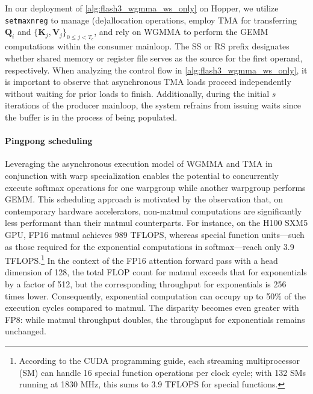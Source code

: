 In our deployment of \cref{alg:flash3_wgmma_ws_only} on Hopper, we utilize \verb|setmaxnreg| to manage (de)allocation operations, employ TMA for transferring $\mathbf{Q}_i$ and $\{ \mathbf{K}_j, \mathbf{V}_j \}_{0 \leq j < T_c}$, and rely on WGMMA to perform the GEMM computations within the consumer mainloop. The SS or RS prefix designates whether shared memory or register file serves as the source for the first operand, respectively. When analyzing the control flow in \cref{alg:flash3_wgmma_ws_only}, it is important to observe that asynchronous TMA loads proceed independently without waiting for prior loads to finish. Additionally, during the initial $s$ iterations of the producer mainloop, the system refrains from issuing waits since the buffer is in the process of being populated.

\paragraph{Pingpong scheduling} Leveraging the asynchronous execution model of WGMMA and TMA in conjunction with warp specialization enables the potential to concurrently execute softmax operations for one warpgroup while another warpgroup performs GEMM. This scheduling approach is motivated by the observation that, on contemporary hardware accelerators, non-matmul computations are significantly less performant than their matmul counterparts. For instance, on the H100 SXM5 GPU, FP16 matmul achieves 989 TFLOPS, whereas special function units—such as those required for the exponential computations in softmax—reach only 3.9 TFLOPS.\footnote{According to the CUDA programming guide, each streaming multiprocessor (SM) can handle 16 special function operations per clock cycle; with 132 SMs running at 1830 MHz, this sums to 3.9 TFLOPS for special functions.} In the context of the FP16 attention forward pass with a head dimension of 128, the total FLOP count for matmul exceeds that for exponentials by a factor of 512, but the corresponding throughput for exponentials is 256 times lower. Consequently, exponential computation can occupy up to 50\% of the execution cycles compared to matmul. The disparity becomes even greater with FP8: while matmul throughput doubles, the throughput for exponentials remains unchanged.

